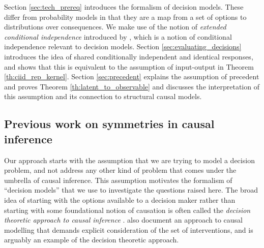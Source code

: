 \documentclass{article}
\begin{document}
Section \ref{sec:tech_prereq} introduces the formalism of decision models. These differ from probability models in that they are a map from a set of options to distributions over consequences. We make use of the notion of \emph{extended conditional independence} introduced by \citet{constantinou_extended_2017}, which is a notion of conditional independence relevant to decision models. Section \ref{sec:evaluating_decisions} introduces the idea of shared conditionally independent and identical responses, and shows that this is equivalent to the assumption of input-output in Theorem \ref{th:ciid_rep_kernel}. Section \ref{sec:precedent} explains the assumption of precedent and proves Theorem \ref{th:latent_to_observable} and discusses the interpretation of this assumption and its connection to structural causal models.

\subsection{Previous work on symmetries in causal inference}\label{sec:prev_work}

Our approach starts with the assumption that we are trying to model a decision problem, and not address any other kind of problem that comes under the umbrella of causal inference. This assumption motivates the formalism of ``decision models'' that we use to investigate the questions raised here. The broad idea of starting with the options available to a decision maker rather than starting with some foundational notion of causation is often called the \emph{decision theoretic approach to causal inference} \citep{heckerman_decision-theoretic_1995,dawid_decision-theoretic_2012,dawid_decision-theoretic_2020}. \citet{lattimore_causal_2019,lattimore_replacing_2019} also document an approach to causal modelling that demands explicit consideration of the set of interventions, and is arguably an example of the decision theoretic approach.
\end{document}
